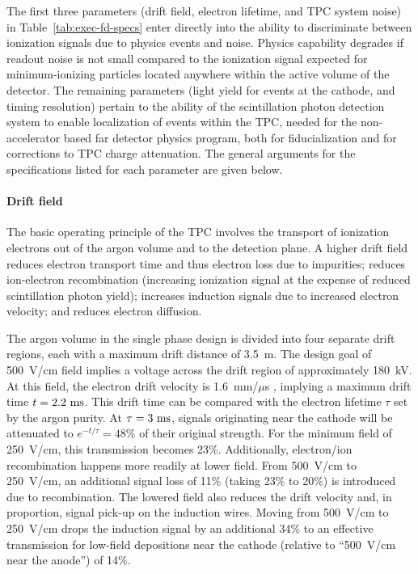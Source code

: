 The first three parameters (drift field, electron lifetime, 
and TPC system noise) in Table~\ref{tab:exec-fd-specs} 
enter directly into the ability to discriminate between 
ionization signals due to physics events and noise.  Physics 
capability degrades if readout noise is not small compared to 
the ionization signal expected for minimum-ionizing particles
located anywhere within the active volume of the detector.
The remaining parameters (light yield for events at the cathode, 
and timing resolution) pertain to the ability 
of the scintillation photon detection system to enable 
localization of events within the TPC, needed for the 
non-accelerator based far detector physics program, both 
for fiducialization and for corrections to TPC charge 
attenuation.  The general 
arguments for the specifications listed for each parameter 
are given below.

\paragraph{Drift field}
The basic operating principle of the TPC involves the transport 
of ionization electrons out of the argon volume and to the 
detection plane.   
A higher drift field reduces electron transport time 
and thus electron loss due to impurities; 
reduces ion-electron recombination (increasing ionization signal at the expense of reduced scintillation photon yield); increases induction 
signals due to increased electron velocity; and reduces 
electron diffusion.


The argon volume in the  single phase design is 
divided into four separate drift regions, each with a maximum 
drift distance of 3.5~m.  The design goal of 500~V/cm field 
implies a voltage across the drift region of approximately 
180~kV.  At this field, the electron drift velocity is 
1.6~mm/$\mu$s , implying a maximum drift time $t=2.2~\rm{ms}$.  
This drift time can be compared with the electron lifetime 
$\tau$ set by the argon purity.  At $\tau=3~\rm{ms}$, signals
originating near the cathode will be attenuated to 
$e^{-t/\tau} = 48\%$ of their original strength.  
For the minimum field of 250~V/cm, this transmission becomes 
23\%.  Additionally, electron/ion recombination happens more 
readily at lower field.  From 500~V/cm to 250~V/cm, 
an additional signal loss of 11\% (taking 23\% to 20\%) is 
introduced due to recombination.  The lowered field also 
reduces the drift velocity and, in proportion, signal pick-up 
on the induction wires.  Moving from 500~V/cm to 250~V/cm drops 
the induction signal by an additional 34\% to an effective
transmission for low-field depositions near the cathode 
(relative to ``500~V/cm near the anode'') of 14\%.

